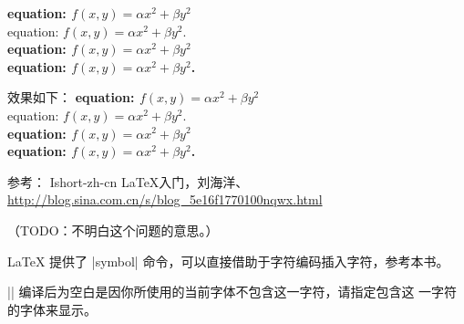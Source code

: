 \begin{itemize}
\begin{texlist}
  {\bfseries equation: $f(x,y) = \alpha x^2 + \beta y^2$}\\
  equation: $f(x,y) = \alpha x^2 + \beta y^2$.\\
  \bfseries equation: $f(x,y) = \alpha x^2 + \beta y^2$\\
  equation: $f(x,y) = \alpha x^2 + \beta y^2$.\\
  
  \end{texlist}
  效果如下：
  {\bfseries equation: $f(x,y) = \alpha x^2 + \beta y^2$}\\
  equation: $f(x,y) = \alpha x^2 + \beta y^2$.\\
  \bfseries equation: $f(x,y) = \alpha x^2 + \beta y^2$\\
  equation: $f(x,y) = \alpha x^2 + \beta y^2$.\\
\end{itemize}
  参考： Ishort-zh-cn LaTeX入门，刘海洋、\url{http://blog.sina.com.cn/s/blog_5e16f1770100nqwx.html}




（TODO：不明白这个问题的意思。）





\LaTeX{} 提供了 |symbol| 命令，可以直接借助于字符编码插入字符，参考本书。

|| 编译后为空白是因你所使用的当前字体不包含这一字符，请指定包含这
一字符的字体来显示。
\begin{texlist}
\newCJKfontfamily{} 
\cjksans {} 
\end{texlist}





